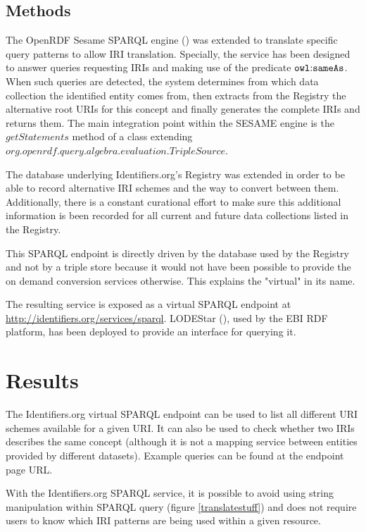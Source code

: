 \documentclass{bioinfo}
\begin{document}
\begin{methods}
\section{Methods}
The OpenRDF Sesame SPARQL engine (\cite{SESAME}) was extended to translate specific query patterns to allow IRI translation. Specially, the service has been designed to answer queries requesting IRIs and making use of the predicate $\mathtt{owl\text{\rm :}{}sameAs}$.  When such queries are detected, the system determines from which data collection the identified entity comes from, then extracts from the Registry the alternative root URIs for this concept and finally generates the complete IRIs and returns them. The main integration point within the SESAME engine is the $getStatements$ method of a class extending $org.openrdf.query.algebra.evaluation.TripleSource$.

The database underlying Identifiers.org's Registry was extended in order to be able to record alternative IRI schemes and the way to convert between them. Additionally, there is a constant curational effort to make sure this additional information is been recorded for all current and future data collections listed in the Registry.

This SPARQL endpoint is directly driven by the database used by the Registry and not by a triple store because it would not have been possible to provide the on demand conversion services otherwise. This explains the "virtual" in its name. 

The resulting service is exposed as a virtual SPARQL endpoint at \href{http://identifiers.org/services/sparql}{http://identifiers.org/services/sparql}. LODEStar (\cite{LODEStar}), used by the EBI RDF platform, has been deployed to provide an interface for querying it.
\end{methods}


\section{Results}
The Identifiers.org virtual SPARQL endpoint can be used to list all different URI schemes available for a given URI. It can also be used to check whether two IRIs describes the same concept (although it is not a mapping service between entities provided by different datasets). Example queries can be found at the endpoint page URL.

With the Identifiers.org SPARQL service, it is possible to avoid using string manipulation within SPARQL query (figure \ref{translatestuff}) and does not require users to know which IRI patterns are being used within a given resource.
\end{document}
